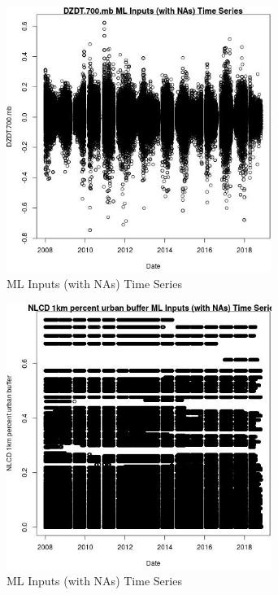 \begin{figure} 
\centering  
\includegraphics[width=0.77\textwidth]{Code_Outputs/Report_ML_input_PM25_Step4_part_e_de_duplicated_aves_compiled_2019-05-20wNAs_DZDT700mbvDate.jpg} 
\caption{\label{fig:Report_ML_input_PM25_Step4_part_e_de_duplicated_aves_compiled_2019-05-20wNAsDZDT700mbvDate}ML Inputs (with NAs) Time Series} 
\end{figure} 
 

\begin{figure} 
\centering  
\includegraphics[width=0.77\textwidth]{Code_Outputs/Report_ML_input_PM25_Step4_part_e_de_duplicated_aves_compiled_2019-05-20wNAs_NLCD_1km_percent_urban_buffervDate.jpg} 
\caption{\label{fig:Report_ML_input_PM25_Step4_part_e_de_duplicated_aves_compiled_2019-05-20wNAsNLCD_1km_percent_urban_buffervDate}ML Inputs (with NAs) Time Series} 
\end{figure} 
 

